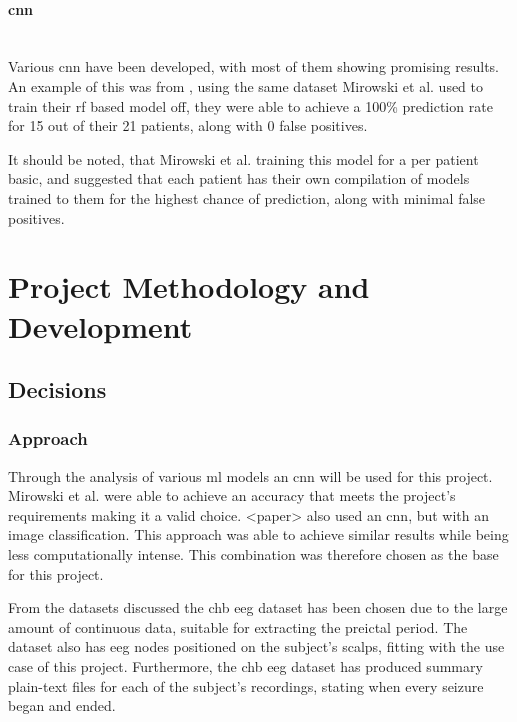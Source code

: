 \documentclass[12pt]{article}
\begin{document}
\paragraph{\acrfull{cnn}}\mbox{}\\

Various \acrshort{cnn} have been developed, with most of them showing promising results. An example of this was from \cite{mirowski2009classification}, using the same dataset Mirowski et al. used to train their \acrshort{rf} based model off, they were able to achieve a 100\% prediction rate for 15 out of their 21 patients, along with 0 false positives. 

It should be noted, that Mirowski et al. training this model for a per patient basic, and suggested that each patient has their own compilation of models trained to them for the highest chance of prediction, along with minimal false positives. 





\section{Project Methodology and Development}

\subsection{Decisions}

\subsubsection{Approach}

Through the analysis of various \acrshort{ml} models an \acrshort{cnn} will be used for this project. Mirowski et al. were able to achieve an accuracy that meets the project's requirements making it a valid choice. <paper> also used an \acrshort{cnn}, but with an image classification. This approach was able to achieve similar results while being less computationally intense. This combination was therefore chosen as the base for this project. 

From the datasets discussed the \acrfull{chb} \acrshort{eeg} dataset has been chosen due to the large amount of continuous data, suitable for extracting the preictal period. The dataset also has \acrshort{eeg} nodes positioned on the subject's scalps, fitting with the use case of this project. Furthermore, the \acrshort{chb} \acrshort{eeg} dataset has produced summary plain-text files for each of the subject's recordings, stating when every seizure began and ended. 
\end{document}
